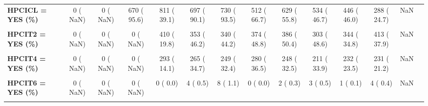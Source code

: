 \documentclass[
]{article}
\begin{document}
\begin{table}[H]
\begin{tabular}[t]{>{\raggedright\arraybackslash}p{5em}ccccccccccccc}
\textbf{HPCICL = YES (\%)} & 0 (  NaN) & 0 (  NaN) & 670 ( 95.6) & 811 ( 39.1) & 697 ( 90.1) & 730 ( 93.5) & 512 ( 66.7) & 629 ( 55.8) & 534 ( 46.7) & 446 ( 46.0) & 288 ( 24.7) & NaN & \\
\textbf{\cellcolor{gray!10}{HPCIT1 = YES (\%)}} & \cellcolor{gray!10}{0 (  NaN)} & \cellcolor{gray!10}{0 (  NaN)} & \cellcolor{gray!10}{0 (  NaN)} & \cellcolor{gray!10}{20 (  1.0)} & \cellcolor{gray!10}{17 (  2.2)} & \cellcolor{gray!10}{16 (  2.1)} & \cellcolor{gray!10}{20 (  2.6)} & \cellcolor{gray!10}{34 (  4.5)} & \cellcolor{gray!10}{39 (  6.3)} & \cellcolor{gray!10}{42 (  4.3)} & \cellcolor{gray!10}{32 (  2.9)} & \cellcolor{gray!10}{NaN} & \cellcolor{gray!10}{}\\
\textbf{HPCIT2 = YES (\%)} & 0 (  NaN) & 0 (  NaN) & 0 (  NaN) & 410 ( 19.8) & 353 ( 46.2) & 340 ( 44.2) & 374 ( 48.8) & 386 ( 50.4) & 303 ( 48.6) & 344 ( 34.8) & 413 ( 37.9) & NaN & \\
\textbf{\cellcolor{gray!10}{HPCIT3 = YES (\%)}} & \cellcolor{gray!10}{0 (  NaN)} & \cellcolor{gray!10}{0 (  NaN)} & \cellcolor{gray!10}{0 (  NaN)} & \cellcolor{gray!10}{269 ( 13.0)} & \cellcolor{gray!10}{245 ( 32.1)} & \cellcolor{gray!10}{245 ( 31.9)} & \cellcolor{gray!10}{237 ( 30.9)} & \cellcolor{gray!10}{237 ( 31.0)} & \cellcolor{gray!10}{223 ( 35.8)} & \cellcolor{gray!10}{233 ( 23.6)} & \cellcolor{gray!10}{246 ( 22.5)} & \cellcolor{gray!10}{NaN} & \cellcolor{gray!10}{}\\
\textbf{HPCIT4 = YES (\%)} & 0 (  NaN) & 0 (  NaN) & 0 (  NaN) & 293 ( 14.1) & 265 ( 34.7) & 249 ( 32.4) & 280 ( 36.5) & 248 ( 32.5) & 211 ( 33.9) & 232 ( 23.5) & 231 ( 21.2) & NaN & \\
\textbf{\cellcolor{gray!10}{HPCIT5 = YES (\%)}} & \cellcolor{gray!10}{0 (  NaN)} & \cellcolor{gray!10}{0 (  NaN)} & \cellcolor{gray!10}{0 (  NaN)} & \cellcolor{gray!10}{36 (  1.7)} & \cellcolor{gray!10}{25 (  3.3)} & \cellcolor{gray!10}{25 (  3.3)} & \cellcolor{gray!10}{29 (  3.8)} & \cellcolor{gray!10}{26 (  3.5)} & \cellcolor{gray!10}{11 (  1.9)} & \cellcolor{gray!10}{20 (  2.0)} & \cellcolor{gray!10}{11 (  1.0)} & \cellcolor{gray!10}{NaN} & \cellcolor{gray!10}{}\\
\textbf{HPCIT6 = YES (\%)} & 0 (  NaN) & 0 (  NaN) & 0 (  NaN) & 0 (  0.0) & 4 (  0.5) & 8 (  1.1) & 0 (  0.0) & 2 (  0.3) & 3 (  0.5) & 1 (  0.1) & 4 (  0.4) & NaN & \\
\textbf{\cellcolor{gray!10}{HPCIW2B = YES (\%)}} & \cellcolor{gray!10}{117 ( 20.6)} & \cellcolor{gray!10}{428 ( 56.3)} & \cellcolor{gray!10}{273 ( 38.9)} & \cellcolor{gray!10}{356 ( 17.2)} & \cellcolor{gray!10}{255 ( 32.9)} & \cellcolor{gray!10}{170 ( 21.8)} & \cellcolor{gray!10}{99 ( 12.9)} & \cellcolor{gray!10}{95 (  8.4)} & \cellcolor{gray!10}{80 (  6.9)} & \cellcolor{gray!10}{64 (  6.6)} & \cellcolor{gray!10}{86 (  8.0)} & \cellcolor{gray!10}{<0.001} & \cellcolor{gray!10}{}\\

\end{tabular}
\end{table}
\end{document}
